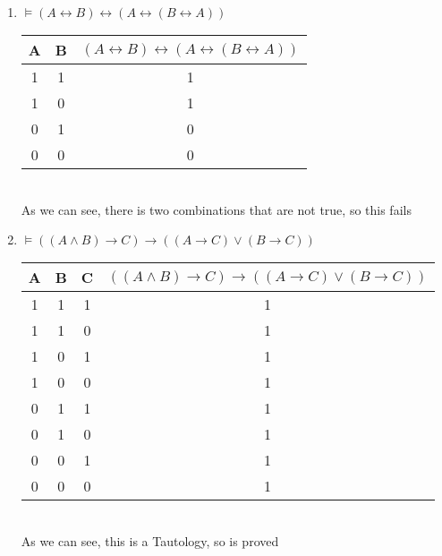 \documentclass{article}
\begin{document}
\begin{enumerate}
    \item $\models (A \leftrightarrow B) \leftrightarrow (A \leftrightarrow (B \leftrightarrow A))$
    \begin{table}[h!]
        \centering
        \begin{tabular}{|c|c|c|}
            \hline
            \textbf{A} & \textbf{B} & \textbf{$ (A \leftrightarrow B) \leftrightarrow (A \leftrightarrow (B \leftrightarrow A))$}\\
            \hline
            1 & 1 & 1 \\
            \hline
            1 & 0 & 1 \\
            \hline
            0 & 1 & 0 \\
            \hline
            0 & 0 & 0 \\
            \hline
        \end{tabular}
    \end{table}
    \\As we can see, there is two combinations that are not true, so this fails
    \newpage

    \item $\models ((A \wedge B) \rightarrow C) \rightarrow ((A \rightarrow C) \vee (B \rightarrow C))$
    \begin{table}[h!]
        \centering
        \begin{tabular}{|c|c|c|c|}
            \hline
            \textbf{A} & \textbf{B} & \textbf{C}  & \textbf{$((A \wedge B) \rightarrow C) \rightarrow ((A \rightarrow C) \vee (B \rightarrow C))$}\\
            \hline
            1 & 1 & 1 & 1 \\
            \hline
            1 & 1 & 0 & 1 \\
            \hline
            1 & 0 & 1 & 1 \\
            \hline
            1 & 0 & 0 & 1 \\
            \hline
            0 & 1 & 1 & 1 \\
            \hline
            0 & 1 & 0 & 1 \\
            \hline
            0 & 0 & 1 & 1 \\
            \hline
            0 & 0 & 0 & 1 \\
            \hline
        \end{tabular}
    \end{table}
    \\As we can see, this is a Tautology, so is proved
\end{enumerate}
\end{document}

